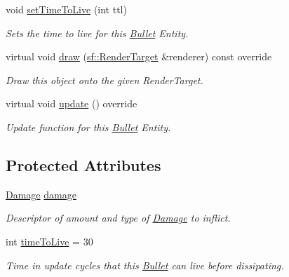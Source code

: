 \begin{DoxyCompactItemize}
void \mbox{\hyperlink{class_bullet_a1f439ddfbd1197e9f9f2e702467853a9}{set\+Time\+To\+Live}} (int ttl)
\begin{DoxyCompactList}\small\item\em Sets the time to live for this \mbox{\hyperlink{class_bullet}{Bullet}} Entity. \end{DoxyCompactList}\item 
virtual void \mbox{\hyperlink{class_bullet_a5b245a34c66d03693318a801703d76eb}{draw}} (\mbox{\hyperlink{classsf_1_1_render_target}{sf\+::\+Render\+Target}} \&renderer) const override
\begin{DoxyCompactList}\small\item\em Draw this object onto the given Render\+Target. \end{DoxyCompactList}\item 
virtual void \mbox{\hyperlink{class_bullet_a738b3fde0d24a67ea0a922cbf9693803}{update}} () override
\begin{DoxyCompactList}\small\item\em Update function for this \mbox{\hyperlink{class_bullet}{Bullet}} Entity. \end{DoxyCompactList}\end{DoxyCompactItemize}
\subsection*{Protected Attributes}
\begin{DoxyCompactItemize}
\item 
\mbox{\label{class_bullet_ace9015e7ac3bb91f1762a3f2e8bb0aa8}} 
\mbox{\hyperlink{struct_damage}{Damage}} \mbox{\hyperlink{class_bullet_ace9015e7ac3bb91f1762a3f2e8bb0aa8}{damage}}
\begin{DoxyCompactList}\small\item\em Descriptor of amount and type of \mbox{\hyperlink{struct_damage}{Damage}} to inflict. \end{DoxyCompactList}\item 
\mbox{\label{class_bullet_a48b9223e32451aade1c9e1c317bea693}} 
int \mbox{\hyperlink{class_bullet_a48b9223e32451aade1c9e1c317bea693}{time\+To\+Live}} = 30
\begin{DoxyCompactList}\small\item\em Time in update cycles that this \mbox{\hyperlink{class_bullet}{Bullet}} can live before dissipating. \end{DoxyCompactList}\end{DoxyCompactItemize}
